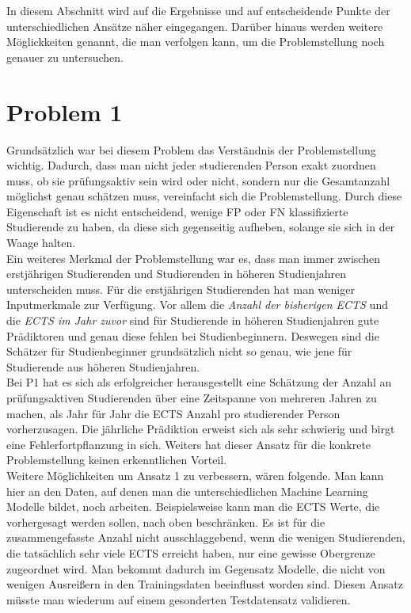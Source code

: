 In diesem Abschnitt wird auf die Ergebnisse und auf entscheidende Punkte der unterschiedlichen Ans\"atze n\"aher eingegangen.
Dar\"uber hinaus werden weitere M\"oglickkeiten genannt, die man verfolgen kann, um die Problemstellung noch genauer zu untersuchen. \\






\section{Problem 1}

Grunds\"atzlich war bei diesem Problem das Verst\"andnis der Problemstellung wichtig. Dadurch, dass man nicht jeder studierenden Person exakt zuordnen muss,
ob sie pr\"ufungsaktiv sein wird oder nicht, sondern nur die Gesamtanzahl m\"oglichst genau sch\"atzen muss, vereinfacht sich die Problemstellung.
Durch diese Eigenschaft ist es nicht entscheidend, wenige FP oder FN klassifizierte Studierende zu haben, da diese sich gegenseitig aufheben, solange sie sich in der
Waage halten. \\

Ein weiteres Merkmal der Problemstellung war es, dass man immer zwischen erstj\"ahrigen Studierenden und Studierenden in h\"oheren Studienjahren unterscheiden muss.
F\"ur die erstj\"ahrigen Studierenden hat man weniger Inputmerkmale zur Verf\"ugung. Vor allem die \textit{Anzahl der bisherigen ECTS} und die \textit{ECTS im Jahr zuvor} sind f\"ur
Studierende in h\"oheren Studienjahren gute Pr\"adiktoren und genau diese fehlen bei Studienbeginnern. Deswegen sind die Sch\"atzer f\"ur Studienbeginner grunds\"atzlich
nicht so genau, wie jene f\"ur Studierende aus h\"oheren Studienjahren. \\

Bei P1 hat es sich als erfolgreicher herausgestellt eine Sch\"atzung der Anzahl an pr\"ufungsaktiven Studierenden \"uber eine Zeitspanne von mehreren
Jahren zu machen, als Jahr f\"ur Jahr die ECTS Anzahl pro studierender Person vorherzusagen. Die j\"ahrliche Pr\"adiktion erweist sich als
sehr schwierig und birgt eine Fehlerfortpflanzung in sich. Weiters hat dieser Ansatz f\"ur die konkrete Problemstellung keinen erkenntlichen Vorteil. \\

Weitere M\"oglichkeiten um Ansatz 1 zu verbessern, w\"aren folgende. Man kann hier an den Daten, auf denen man die unterschiedlichen Machine Learning
Modelle bildet, noch arbeiten. Beispielsweise kann man die ECTS Werte, die vorhergesagt werden sollen, nach oben beschr\"anken. Es ist f\"ur die
zusammengefasste Anzahl nicht ausschlaggebend, wenn die wenigen Studierenden, die tats\"achlich sehr viele ECTS erreicht haben, nur eine gewisse Obergrenze zugeordnet wird.
Man bekommt dadurch im Gegensatz Modelle, die nicht von wenigen Ausrei{\ss}ern in den Trainingsdaten beeinflusst worden sind. Diesen Ansatz m\"usste man wiederum
auf einem gesonderten Testdatensatz validieren. \\


